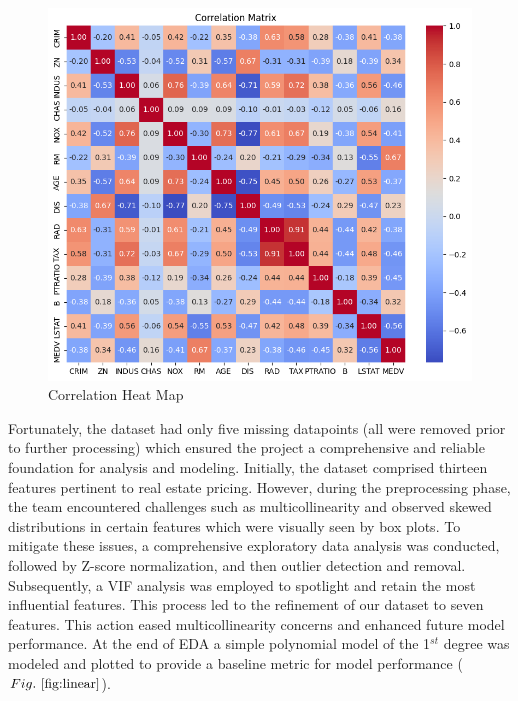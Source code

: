 \documentclass[conference, 11pt]{IEEEtran}
\begin{document}
\begin{figure}
    \centering
    \includegraphics[width=1\linewidth]{heatmap.png}
    \caption{Correlation Heat Map}
    \label{fig:corr}
\end{figure}

Fortunately, the dataset had only five missing datapoints (all were removed prior to further processing) which ensured the project a comprehensive and reliable foundation for analysis and modeling. Initially, the dataset comprised thirteen features pertinent to real estate pricing. However, during the preprocessing phase, the team encountered challenges such as multicollinearity and observed skewed distributions in certain features which were visually seen by box plots. To mitigate these issues, a comprehensive exploratory data analysis was conducted, followed by Z-score normalization, and then outlier detection and removal. Subsequently, a VIF analysis was employed to spotlight and retain the most influential features. This process led to the refinement of our dataset to seven features. This action eased multicollinearity concerns and enhanced future model performance. At the end of EDA a simple polynomial model of the 1$^{st}$ degree was modeled and plotted to provide a baseline metric for model performance ($Fig.~\ref{fig:linear}$).
\end{document}
